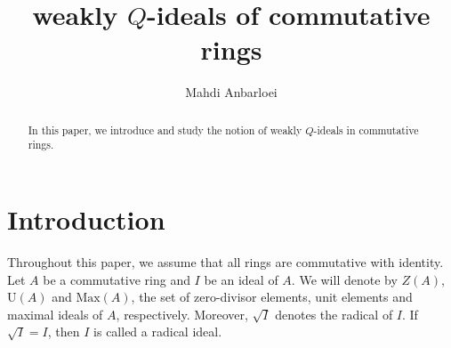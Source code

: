 \documentclass[preprint,review,10pt]{amsart}
\theoremstyle{definition}
\theoremstyle{remark}
\numberwithin{equation}{section}
\begin{document}
\title{weakly $Q$-ideals of commutative rings}


\author{Mahdi Anbarloei}
\address{Department of Mathematics, Faculty of Sciences,
Imam Khomeini International University, Qazvin, Iran.
}






 

\begin{abstract}
 In this paper, we introduce and study the notion of  weakly $Q$-ideals in  commutative rings. 

\end{abstract}
\maketitle

\section{Introduction} 
Throughout this paper, we assume  that all rings are commutative with identity. Let $A$ be a commutative ring and $I$ be an ideal of $A$. We will denote by $Z(A)$, $\text{U}(A)$ and $\text{Max}(A)$, the set of zero-divisor elements, unit elements and maximal ideals of $A$, respectively. Moreover, $\sqrt{I}$ denotes the radical of $I$. If $\sqrt{I}=I$, then $I$ is called a radical ideal.
\end{document}

